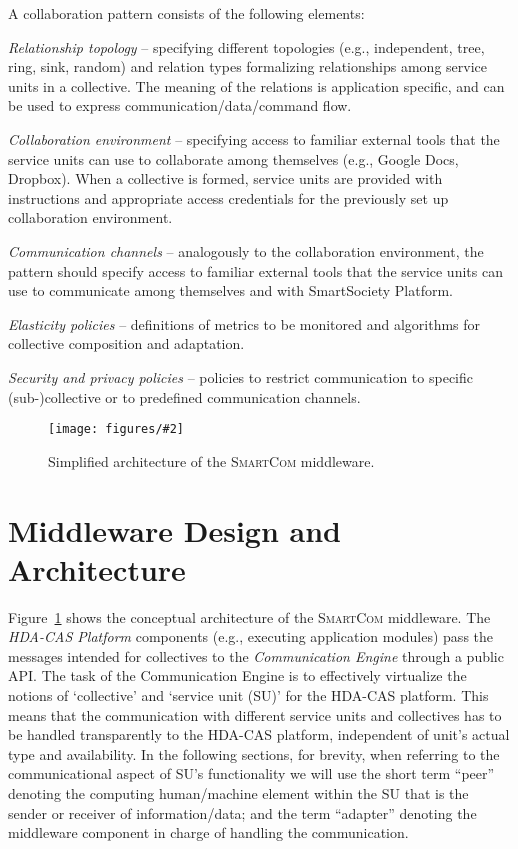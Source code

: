 \documentclass{llncs}
\newcommand{\mdl}{\textsc{SmartCom}}
\newcommand{\figfloat}[3][0.9]{
\begin{figure}[h] 
\centering
\texttt{[image: figures/\#2]}
\caption{#3}
\label{fig:#2}
\end{figure}
}
\begin{document}
      A collaboration pattern consists of the following elements:
      \begin{inparaenum}[1) \itshape]%
		\item \emph{Relationship topology} -- specifying different topologies (e.g., independent, tree, ring, sink, random) and relation types formalizing relationships among service units in a collective. The meaning of the relations is application specific, and can be used to express communication/data/command flow. 
		\item \emph{Collaboration environment} -- specifying access to familiar external tools that the service units can use to collaborate among themselves (e.g., Google Docs, Dropbox). When a collective is formed, service units are provided with instructions and appropriate access credentials for the previously set up collaboration environment. 
		\item \emph{Communication channels} -- analogously to the collaboration environment, the pattern should specify access to familiar external tools that the service units can use to communicate among themselves and with SmartSociety Platform. 
		\item \emph{Elasticity policies} -- definitions of metrics to be monitored and algorithms for collective composition and adaptation.
		\item \emph{Security and privacy policies} -- policies to restrict communication to specific (sub-)collective or to predefined communication channels.
	  \end{inparaenum}

  \figfloat[1.]{smartcom-architecture}{Simplified architecture of the \mdl{} middleware.}

  \section{Middleware Design and Architecture}
  \label{sec:middleware}

  Figure~\ref{fig:smartcom-architecture} shows the conceptual architecture of the \mdl{} middleware. The \emph{HDA-CAS Platform} components (e.g., executing application modules) pass the messages intended for collectives to the \emph{Communication Engine} through a public API. The task of the Communication Engine is to effectively virtualize the notions of `collective' and `service unit (SU)' for the HDA-CAS platform. This means that the communication with different service units and collectives has to be handled transparently to the HDA-CAS platform, independent of unit's actual type and availability. 
  In the following sections, for brevity, when referring to the communicational aspect of SU's functionality we will use the short term ``peer'' denoting the computing human/machine element within the SU that is the sender or receiver of information/data; and the term ``adapter'' denoting the middleware component in charge of handling the communication.
\end{document}
